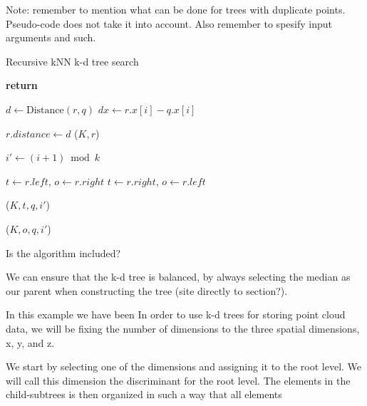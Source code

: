 Note: remember to mention what can be done for trees with duplicate points. Pseudo-code does not take it into account. Also remember to spesify input arguments and such.

\begin{algorithm}
\caption{Recursive kNN k-d tree search}
\label{alg:recursive_knn_kd_tree_search}
\begin{algorithmic}
         
            \State \textbf{return} 
        \EndIf

        \State $d \gets \text{Distance}(r, q)$
        \State $dx \gets r.x[i] - q.x[i]$

         
            \State $r.distance \gets d$
            \State {}($K, r$)
        \EndIf

        \State $i' \gets (i + 1) \bmod k$ 

          
            \State $t \gets r.left$, $o \gets r.right$
        \Else
            \State $t \gets r.right$, $o \gets r.left$
        \EndIf

        \State {}($K, t, q, i'$)

         
            \State {}($K, o, q, i'$)
        \EndIf
    \EndProcedure
\end{algorithmic}
\end{algorithm}

Is the algorithm included?


We can ensure that the k-d tree is balanced, by always selecting the median as our parent when constructing the tree \cite{Bentley:1975:MBS:361002.361007} (site directly to section?).



In this example we have been In order to use k-d trees for storing point cloud data, we will be fixing the number of dimensions to the three spatial dimensions, x, y, and z.

We start by selecting one of the dimensions and assigning it to the root level. We will call this dimension the discriminant for the root level. The elements in the child-subtrees is then organized in such a way that all elements 

